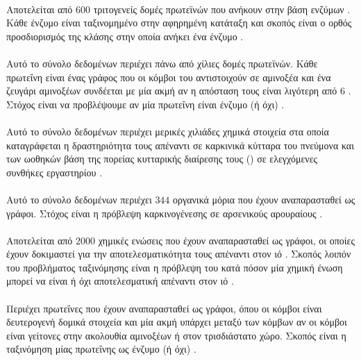 \paragraph*{} Αποτελείται από $600$ τριτογενείς δομές πρωτεϊνών που ανήκουν στην βάση ενζύμων .
Κάθε ένζυμο είναι ταξινομημένο στην αφηρημένη κατάταξη  και σκοπός είναι ο ορθός προσδιορισμός της κλάσης στην οποία ανήκει ένα ένζυμο \cite{Borgwardt2005}.

\paragraph*{} Αυτό το σύνολο δεδομένων περιέχει πάνω από χίλιες δομές πρωτεϊνών.
Κάθε πρωτεΐνη είναι ένας γράφος που οι κόμβοι του αντιστοιχούν σε αμινοξέα και ένα ζευγάρι αμινοξέων συνδέεται με μία ακμή αν η απόσταση τους είναι λιγότερη από 6 .
Στόχος είναι να προβλέψουμε αν μία πρωτεΐνη είναι ένζυμο (ή όχι) \cite{DobsonDoig03, shervashidze2011weisfeiler}.

\paragraph*{} Αυτό το σύνολο δεδομένων περιέχει μερικές χιλιάδες χημικά στοιχεία στα οποία καταγράφεται η δραστηριότητα τους απέναντι σε καρκινικά κύτταρα του πνεύμονα και των ωοθηκών βάση της πορείας κυτταρικής διαίρεσης τους () σε ελεγχόμενες συνθήκες εργαστηρίου \cite{Wale2008}.

\paragraph*{} Αυτό το σύνολο δεδομένων περιέχει $344$ οργανικά μόρια που έχουν αναπαρασταθεί ως γράφοι.
Στόχος είναι η πρόβλεψη καρκινογένεσης σε αρσενικούς αρουραίους \cite{Toivonen2003}.

\paragraph*{} Αποτελείται από $2000$ χημικές ενώσεις που έχουν αναπαρασταθεί ως γράφοι, οι οποίες έχουν δοκιμαστεί για την αποτελεσματικότητα τους απέναντι στον ιό . Σκοπός λοιπόν του προβλήματος ταξινόμησης είναι η πρόβλεψη του κατά πόσον μία χημική ένωση μπορεί να είναι ή όχι αποτελεσματική απέναντι στον ιό \cite{Riesen08}.

\paragraph*{} Περιέχει πρωτεΐνες που έχουν αναπαρασταθεί ως γράφοι, όπου οι κόμβοι είναι δευτερογενή δομικά στοιχεία και μία ακμή υπάρχει μεταξύ των κόμβων αν οι κόμβοι είναι γείτονες στην ακολουθία αμινοξέων ή στον τρισδιάστατο χώρο.
Σκοπός είναι η ταξινόμηση μίας πρωτεΐνης ως ένζυμο (ή όχι) \cite{borgwardt2005protein}.

